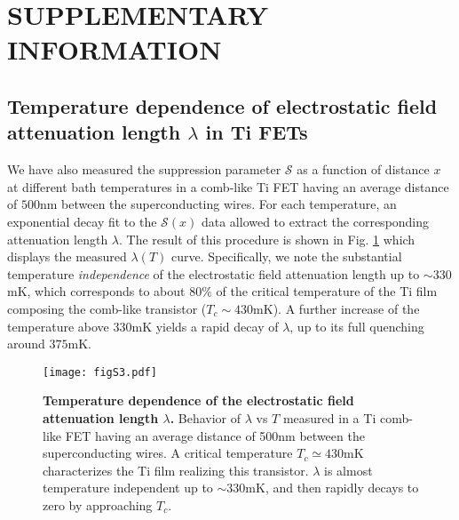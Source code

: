 \documentclass[prl,twocolumn,reprint,graphicx,showpacs,superscriptaddress,floatfix]{revtex4-1}
\begin{document}


\section{SUPPLEMENTARY INFORMATION}

\subsection{Temperature dependence of electrostatic field attenuation length $\lambda$ in Ti FETs}

We have also measured the suppression parameter $\mathcal{S}$ as a function of distance $x$ at different bath temperatures in a comb-like Ti FET having an average distance of $500$nm between the superconducting wires. 
For each temperature, an exponential decay fit to the $\mathcal{S}(x)$ data allowed to extract the corresponding attenuation length $\lambda$.
The result of this procedure is shown in Fig. \ref{figS3} which displays the measured $\lambda (T)$ curve. 
Specifically, we note the substantial temperature \emph{independence} of the electrostatic field attenuation length  up to $\sim 330$mK, which corresponds to about  $80\%$ of the critical temperature of the Ti film composing the comb-like transistor ($T_c\sim 430$mK). A further increase of the temperature above $330$mK yields a rapid decay of $\lambda$, up to its full quenching around $375$mK. 
\begin{figure}[t!]
\begin{center}
\texttt{[image: figS3.pdf]}\vspace{-3mm}
\caption{\textbf{Temperature dependence of the electrostatic field attenuation length $\lambda$.} 
Behavior of $\lambda$ vs $T$ measured in a Ti comb-like FET having an average distance of 500nm between the superconducting wires. A critical temperature $T_c\simeq 430$mK characterizes the Ti film realizing this transistor. $\lambda$ is almost temperature independent up to $\sim 330$mK, and then rapidly decays to zero by approaching $T_c$.
}
\label{figS3}
\end{center}
\end{figure}
\end{document}
